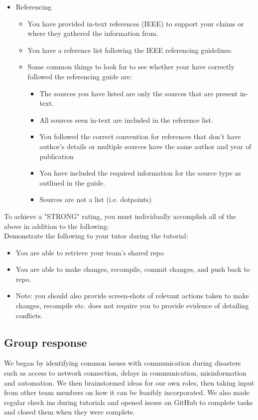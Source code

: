 \documentclass[a4paper, 11pt]{report}
\begin{document}
\begin{itemize}
\begin{itemize}
	\end{itemize}
\item Referencing
	\begin{itemize}
	\item You have provided in-text references (IEEE) to support your claims or where they gathered the information from.
	\item You have a reference list following the IEEE referencing guidelines.
	\item Some common things to look for to see whether your have correctly followed the referencing guide are:
		\begin{itemize}
		\item The sources you have listed are only the sources that are present in-text.
		\item All sources seen in-text are included in the reference list.
		\item You followed the correct convention for references that don’t have author’s details or multiple sources have the same author and year of publication
		\item You have included the required information for the source type as outlined in the guide.
		\item Sources are not a list (i.e. dotpoints)
		\end{itemize}
	\end{itemize}
\end{itemize}

To achieve a "STRONG" rating, you must individually accomplish all of the above in addition to the following:\\
Demonstrate the following to your tutor during the tutorial:
\begin{itemize}
\item You are able to retrieve your team’s shared repo
\item You are able to make changes, recompile, commit changes, and push back to repo.
\item Note: you should also provide screen-shots of relevant actions taken to make changes, recompile etc. does not require you to provide evidence of detailing conflicts.
\end{itemize}


\subsection{Group response}

We began by identifying common issues with communication during disasters such as access to network connection, delays in communication, misinformation and automation. We then brainstormed ideas for our own roles, then taking input from other team members on how it can be feasibly incorporated. We also made regular check ins during tutorials and opened issues on GitHub to complete tasks and closed them when they were complete.\newline
\end{document}

